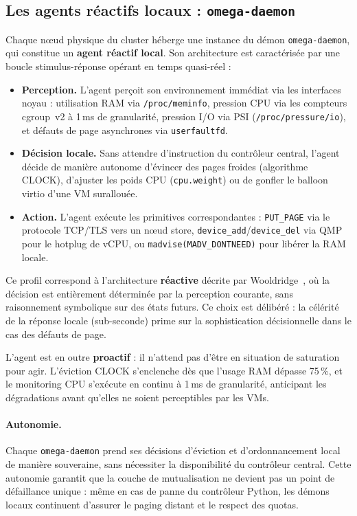 \subsection{Les agents réactifs locaux : \texttt{omega-daemon}}
\label{subsec:sma-daemon}

Chaque nœud physique du cluster héberge une instance du démon \texttt{omega-daemon}, qui constitue un \textbf{agent réactif local}. Son architecture est caractérisée par une boucle stimulus-réponse opérant en temps quasi-réel :

\begin{itemize}
    \item \textbf{Perception.} L'agent perçoit son environnement immédiat via les interfaces noyau : utilisation RAM via \texttt{/proc/meminfo}, pression CPU via les compteurs cgroup~v2 à 1\,ms de granularité, pression I/O via PSI (\texttt{/proc/pressure/io}), et défauts de page asynchrones via \texttt{userfaultfd}.
    \item \textbf{Décision locale.} Sans attendre d'instruction du contrôleur central, l'agent décide de manière autonome d'évincer des pages froides (algorithme CLOCK), d'ajuster les poids CPU (\texttt{cpu.weight}) ou de gonfler le balloon virtio d'une VM surallouée.
    \item \textbf{Action.} L'agent exécute les primitives correspondantes : \texttt{PUT\_PAGE} via le protocole TCP/TLS vers un nœud store, \texttt{device\_add}/\texttt{device\_del} via QMP pour le hotplug de vCPU, ou \texttt{madvise(MADV\_DONTNEED)} pour libérer la RAM locale.
\end{itemize}

Ce profil correspond à l'architecture \textbf{réactive} décrite par Wooldridge~\cite{wooldridge_2002_sma}, où la décision est entièrement déterminée par la perception courante, sans raisonnement symbolique sur des états futurs. Ce choix est délibéré : la célérité de la réponse locale (sub-seconde) prime sur la sophistication décisionnelle dans le cas des défauts de page.

L'agent est en outre \textbf{proactif} : il n'attend pas d'être en situation de saturation pour agir. L'éviction CLOCK s'enclenche dès que l'usage RAM dépasse 75\,\%, et le monitoring CPU s'exécute en continu à 1\,ms de granularité, anticipant les dégradations avant qu'elles ne soient perceptibles par les VMs.

\paragraph{Autonomie.} Chaque \texttt{omega-daemon} prend ses décisions d'éviction et d'ordonnancement local de manière souveraine, sans nécessiter la disponibilité du contrôleur central. Cette autonomie garantit que la couche de mutualisation ne devient pas un point de défaillance unique : même en cas de panne du contrôleur Python, les démons locaux continuent d'assurer le paging distant et le respect des quotas.

